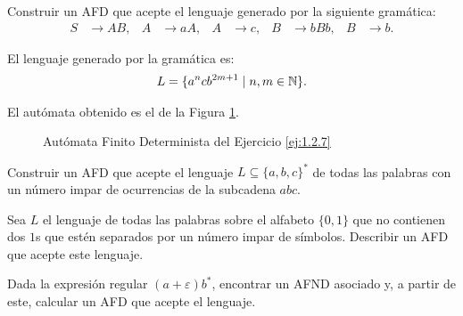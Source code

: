 \begin{ejercicio} \label{ej:1.2.7}
    Construir un AFD que acepte el lenguaje generado por la siguiente gramática:
    \begin{align*}
        S &\to AB, & A &\to aA, & A &\to c, & B &\to bBb, & B &\to b.
    \end{align*}

    El lenguaje generado por la gramática es:
    \begin{align*}
        L = \{a^ncb^{2m+1} \mid n, m \in \mathbb{N}\}.
    \end{align*}

    El autómata obtenido es el de la Figura \ref{fig:ej:1.2.7}.
    \begin{figure}
        \centering
        \caption{Autómata Finito Determinista del Ejercicio \ref{ej:1.2.7}}
        \label{fig:ej:1.2.7}
    \end{figure}

\end{ejercicio}

\begin{ejercicio}
    Construir un AFD que acepte el lenguaje $L \subseteq \{a, b, c\}^*$ de todas las palabras con un número impar de ocurrencias de la subcadena $abc$.
\end{ejercicio}

\begin{ejercicio}
    Sea $L$ el lenguaje de todas las palabras sobre el alfabeto $\{0, 1\}$ que no contienen dos $1$s que estén separados por un número impar de símbolos. Describir un AFD que acepte este lenguaje.
\end{ejercicio}

\begin{ejercicio}
    Dada la expresión regular $(a + \varepsilon)b^*$, encontrar un AFND asociado y, a partir de este, calcular un AFD que acepte el lenguaje.
\end{ejercicio}

